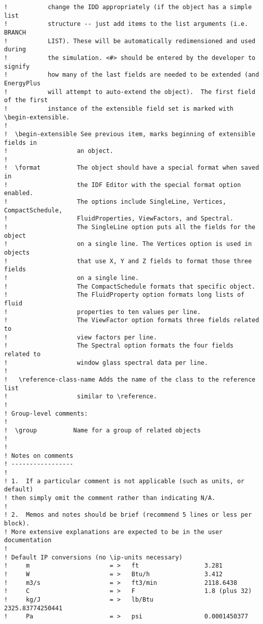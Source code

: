 \begin{lstlisting}
!           change the IDD appropriately (if the object has a simple list
!           structure -- just add items to the list arguments (i.e. BRANCH
!           LIST). These will be automatically redimensioned and used during
!           the simulation. <#> should be entered by the developer to signify
!           how many of the last fields are needed to be extended (and EnergyPlus
!           will attempt to auto-extend the object).  The first field of the first
!           instance of the extensible field set is marked with \begin-extensible.
!
!  \begin-extensible See previous item, marks beginning of extensible fields in
!                   an object.
!
!  \format          The object should have a special format when saved in
!                   the IDF Editor with the special format option enabled.
!                   The options include SingleLine, Vertices, CompactSchedule,
!                   FluidProperties, ViewFactors, and Spectral.
!                   The SingleLine option puts all the fields for the object
!                   on a single line. The Vertices option is used in objects
!                   that use X, Y and Z fields to format those three fields
!                   on a single line.
!                   The CompactSchedule formats that specific object.
!                   The FluidProperty option formats long lists of fluid
!                   properties to ten values per line.
!                   The ViewFactor option formats three fields related to
!                   view factors per line.
!                   The Spectral option formats the four fields related to
!                   window glass spectral data per line.
!
!   \reference-class-name Adds the name of the class to the reference list
!                   similar to \reference.
!
! Group-level comments:
!
!  \group          Name for a group of related objects
!
!
! Notes on comments
! -----------------
!
! 1.  If a particular comment is not applicable (such as units, or default)
! then simply omit the comment rather than indicating N/A.
!
! 2.  Memos and notes should be brief (recommend 5 lines or less per block).
! More extensive explanations are expected to be in the user documentation
!
! Default IP conversions (no \ip-units necessary)
!     m                      = >   ft                  3.281
!     W                      = >   Btu/h               3.412
!     m3/s                   = >   ft3/min             2118.6438
!     C                      = >   F                   1.8 (plus 32)
!     kg/J                   = >   lb/Btu              2325.83774250441
!     Pa                     = >   psi                 0.0001450377

\end{lstlisting}
